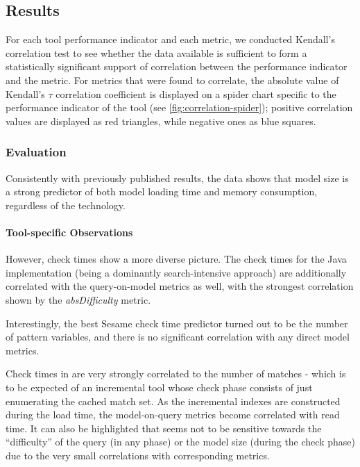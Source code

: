 \subsection{Results}
For each tool performance indicator and each metric, we conducted Kendall's correlation test to see whether the data available is sufficient to form a statistically significant support of correlation between the performance indicator and the metric. For metrics that were found to correlate, the absolute value of Kendall's $\tau$ correlation coefficient is displayed on a spider chart specific to the performance indicator of the tool (see \autoref{fig:correlation-spider}); positive correlation values are displayed as red triangles, while negative ones as blue squares.  

\subsubsection{Evaluation}
Consistently with previously published results, the data shows that model size is a strong predictor of both model loading time and memory consumption, regardless of the technology.
\paragraph{Tool-specific Observations}
However, check times show a more diverse picture. The check times for the Java implementation (being a dominantly search-intensive approach) are additionally correlated with the query-on-model metrics as well, with the strongest correlation shown by the \emph{absDifficulty} metric. 

Interestingly, the best Sesame check time predictor turned out to be the number of pattern variables, and there is no significant correlation with any direct model metrics. 

Check times in \incquery{} are very strongly correlated to the number of matches - which is to be expected of an incremental tool whose check phase consists of just enumerating the cached match set. As the incremental indexes are constructed during the load time, the model-on-query metrics become correlated with \incquery{} read time. It can also be highlighted that \incquery{} seems not to be sensitive towards the ``difficulty'' of the query (in any phase) or the model size (during the check phase) due to the very small correlations with corresponding metrics.
